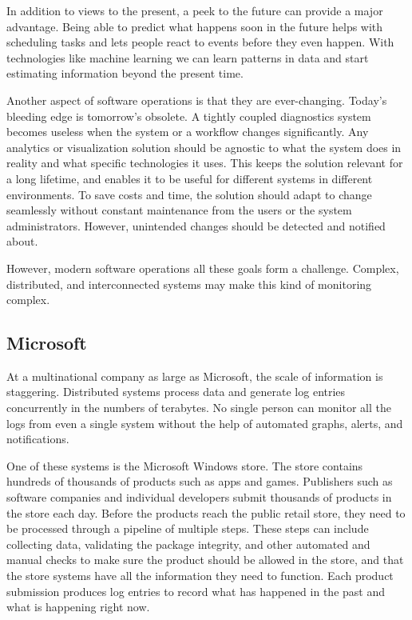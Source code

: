\documentclass[english,12pt,a4paper,pdftex,sci,utf8]{aaltothesis}
\begin{document}
In addition to views to the present, a peek to the future can provide a major advantage.
Being able to predict what happens soon in the future helps with scheduling tasks and lets people react 
to events before they even happen. With technologies like machine learning we can learn patterns in data and 
start estimating information beyond the present time.

Another aspect of software operations is that they are ever-changing. 
Today's bleeding edge is tomorrow's obsolete. A tightly coupled diagnostics system
becomes useless when the system or a workflow changes significantly. Any analytics or visualization solution should
be agnostic to what the system does in reality and what specific technologies it uses. 
This keeps the solution relevant for a long lifetime, 
and enables it to be useful for different systems in different environments. 
To save costs and time, the solution should adapt to change seamlessly without constant maintenance from the users or the system administrators. However, unintended changes should be detected and notified about.

However, modern software operations all these goals form a challenge.
Complex, distributed, and interconnected systems may make this kind of monitoring complex.

\subsection{Microsoft}
At a multinational company as large as Microsoft, the scale of information is staggering.
Distributed systems process data and generate log entries concurrently in the numbers of terabytes.
No single person can monitor all the logs from even a single system without the help of automated
graphs, alerts, and notifications.  

One of these systems is the Microsoft Windows store. The store contains hundreds of thousands of products
such as apps and games. Publishers such as software companies and individual developers submit thousands of 
products in the store each day. Before the products reach the public retail store, they need to be processed
through a pipeline of multiple steps. These steps can include collecting data, validating the package integrity, and
other automated and manual checks to make sure the product should be allowed in the store, 
and that the store systems have all the information they need to function.
Each product submission produces log entries to record what has happened in the past and what is happening right now.
\end{document}
